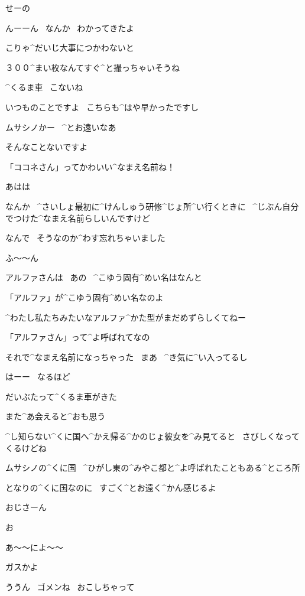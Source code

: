 \page
\Alpha せーの

\Alpha んーーん
\ なんか
\ わかってきたよ

\Alpha こりゃ^{だいじ}{大事}につかわないと

\Alpha ３００^{まい}{枚}なんてすぐ^{と}{撮}っちゃいそうね

\page
\Alpha ^{くるま}{車}
\ こないね

\Kokone いつものことですよ
\ こちらも^{はや}{早}かったですし

\page
\Alpha ムサシノかー
\ ^{とお}{遠}いなあ

\Kokone そんなことないですよ

\Alpha 「ココネさん」ってかわいい^{なまえ}{名前}ね！

\Kokone あはは

\Kokone なんか
\ ^{さいしょ}{最初}に^{けんしゅう}{研修}^{じょ}{所}^{い}{行}くときに
\ ^{じぶん}{自分}でつけた^{なまえ}{名前}らしいんですけど

\Kokone なんで
\ そうなのか^{わす}{忘}れちゃいました

\Alpha ふ〜〜ん

\page
\Kokone アルファさんは
\ あの
\ ^{こゆう}{固有}^{めい}{名}はなんと

\Alpha 「アルファ」が^{こゆう}{固有}^{めい}{名}なのよ

\Alpha ^{わたし}{私}たちみたいなアルファ^{かた}{型}がまだめずらしくてねー

\Alpha 「アルファさん」って^{よ}{呼}ばれてなの

\Alpha それで^{なまえ}{名前}になっちゃった
\ まあ
\ ^{き}{気}に^{い}{入}ってるし

\Kokone はーー
\ なるほど

\page
\Alpha だいぶたって^{くるま}{車}がきた

\Alpha また^{あ}{会}えると^{おも}{思}う

\Alpha ^{し}{知}らない^{くに}{国}へ^{かえ}{帰}る^{かのじょ}{彼女}を^{み}{見}てると
\ さびしくなってくるけどね

\page
\Alpha ムサシノの^{くに}{国}
\ ^{ひがし}{東}の^{みやこ}{都}と^{よ}{呼}ばれたこともある^{ところ}{所}

\Alpha となりの^{くに}{国}なのに
\ すごく^{とお}{遠}く^{かん}{感}じるよ

\page
\Alpha おじさーん

\Ojisan お

\Ojisan あ〜〜によ〜〜

\page
\Ojisan ガスかよ

\Alpha ううん
\ ゴメンね
\ おこしちゃって

